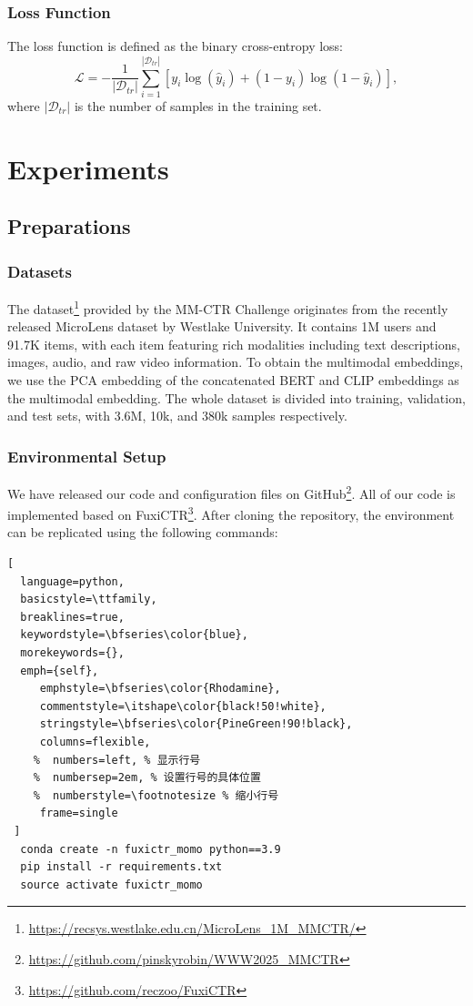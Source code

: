 \documentclass[sigconf, nonacm, screen]{acmart}
\begin{document}
\subsubsection{Loss Function}
The loss function is defined as the binary cross-entropy loss:
\begin{equation}
  \mathcal{L} = -\frac{1}{|\mathcal{D}_{tr}|}\sum_{i=1}^{|\mathcal{D}_{tr}|}\left[y_i\log(\hat{y}_i) + (1-y_i)\log(1-\hat{y}_i)\right],
\end{equation}
where \(|\mathcal{D}_{tr}|\) is the number of samples in the training set.

\section{Experiments}

\subsection{Preparations}
\subsubsection{Datasets}
The dataset\footnote{\url{https://recsys.westlake.edu.cn/MicroLens_1M_MMCTR/}} provided by the MM-CTR Challenge originates from the recently released MicroLens dataset by Westlake University\cite{MicroLens}. 
It contains 1M users and 91.7K items, with each item featuring rich modalities including text descriptions, images, audio, and raw video information.
To obtain the multimodal embeddings, we use the PCA embedding of the concatenated BERT\cite{BERT} and CLIP\cite{CLIP} embeddings as the multimodal embedding.
The whole dataset is divided into training, validation, and test sets, with 3.6M, 10k, and 380k samples respectively.

\subsubsection{Environmental Setup}
We have released our code and configuration files on GitHub\footnote{\url{https://github.com/pinskyrobin/WWW2025_MMCTR}}.
All of our code is implemented based on FuxiCTR\footnote{\url{https://github.com/reczoo/FuxiCTR}}.
After cloning the repository, the environment can be replicated using the following commands:

\begin{lstlisting}[
  language=python,
  basicstyle=\ttfamily,
  breaklines=true,
  keywordstyle=\bfseries\color{blue},
  morekeywords={},
  emph={self},
     emphstyle=\bfseries\color{Rhodamine},
     commentstyle=\itshape\color{black!50!white},
     stringstyle=\bfseries\color{PineGreen!90!black},
     columns=flexible,
    %  numbers=left, % 显示行号
    %  numbersep=2em, % 设置行号的具体位置
    %  numberstyle=\footnotesize % 缩小行号
     frame=single
 ]  
  conda create -n fuxictr_momo python==3.9
  pip install -r requirements.txt
  source activate fuxictr_momo
\end{lstlisting}
\end{document}
